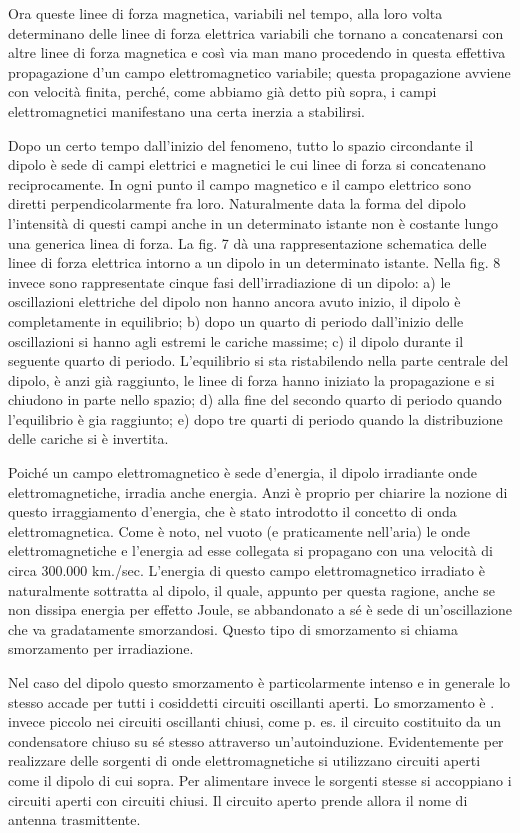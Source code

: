 \documentclass[a4paper]{article}
\begin{document}
Ora queste linee di forza magnetica, variabili nel tempo, alla loro volta determinano delle linee di forza elettrica variabili che tornano a concatenarsi con altre linee di forza magnetica e così via man mano procedendo in questa effettiva propagazione d'un campo elettromagnetico variabile; questa propagazione avviene con velocità finita, perché, come abbiamo già detto più sopra, i campi elettromagnetici manifestano una certa inerzia a stabilirsi.

Dopo un certo tempo dall'inizio del fenomeno, tutto lo spazio circondante il dipolo è sede di campi elettrici e magnetici le cui linee di forza si concatenano reciprocamente. In ogni punto il campo magnetico e il campo elettrico sono diretti perpendicolarmente fra loro. Naturalmente data la forma del dipolo l'intensità di questi campi anche in un determinato istante non è costante lungo una generica linea di forza. La fig. 7 dà una rappresentazione schematica delle linee di forza elettrica intorno a un dipolo in un determinato istante. Nella fig. 8 invece sono rappresentate cinque fasi dell'irradiazione di un dipolo: a) le oscillazioni elettriche del dipolo non hanno ancora avuto inizio, il dipolo è completamente in equilibrio; b) dopo un quarto di periodo dall'inizio delle oscillazioni si hanno agli estremi le cariche massime; c) il dipolo durante il seguente quarto di periodo. L'equilibrio si sta ristabilendo nella parte centrale del dipolo, è anzi già raggiunto, le linee di forza hanno iniziato la propagazione e si chiudono in parte nello spazio; d) alla fine del secondo quarto di periodo quando l'equilibrio è gia raggiunto; e) dopo tre quarti di periodo quando la distribuzione delle cariche si è invertita.

Poiché un campo elettromagnetico è sede d'energia, il dipolo irradiante onde elettromagnetiche, irradia anche energia. Anzi è proprio per chiarire la nozione di questo irraggiamento d'energia, che è stato introdotto il concetto di onda elettromagnetica. Come è noto, nel vuoto (e praticamente nell'aria) le onde elettromagnetiche e l'energia ad esse collegata si propagano con una velocità di circa 300.000 km./sec. L'energia di questo campo elettromagnetico irradiato è naturalmente sottratta al dipolo, il quale, appunto per questa ragione, anche se non dissipa energia per effetto Joule, se abbandonato a sé è sede di un'oscillazione che va gradatamente smorzandosi. Questo tipo di smorzamento si chiama smorzamento per irradiazione.

Nel caso del dipolo questo smorzamento è particolarmente intenso e in generale lo stesso accade per tutti i cosiddetti circuiti oscillanti aperti. Lo smorzamento è . invece piccolo nei circuiti oscillanti chiusi, come p. es. il circuito costituito da un condensatore chiuso su sé stesso attraverso un'autoinduzione. Evidentemente per realizzare delle sorgenti di onde elettromagnetiche si utilizzano circuiti aperti come il dipolo di cui sopra. Per alimentare invece le sorgenti stesse si accoppiano i circuiti aperti con circuiti chiusi. Il circuito aperto prende allora il nome di antenna trasmittente.
\end{document}
